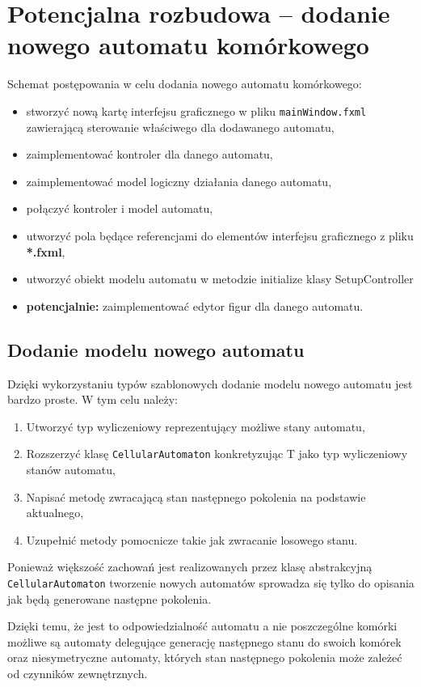 \documentclass{mwart}
\begin{document}
\section{Potencjalna rozbudowa -- dodanie nowego automatu komórkowego}
Schemat postępowania w celu dodania nowego automatu komórkowego:
\begin{itemize}
	\item stworzyć nową kartę interfejsu graficznego w pliku \texttt{mainWindow.fxml} zawierającą sterowanie właściwego dla dodawanego automatu,
	\item zaimplementować kontroler dla danego automatu,
	\item zaimplementować model logiczny działania danego automatu,
	\item połączyć kontroler i model automatu,
	\item utworzyć pola będące referencjami do elementów interfejsu graficznego z pliku \textbf{*.fxml}, 
	\item utworzyć obiekt modelu automatu w metodzie initialize klasy SetupController
	\item \textbf{potencjalnie: } zaimplementować edytor figur dla danego automatu.
\end{itemize}

\subsection{Dodanie modelu nowego automatu}
Dzięki wykorzystaniu typów szablonowych dodanie modelu nowego automatu jest bardzo proste.
W tym celu należy:

\begin{enumerate}
	\item Utworzyć typ wyliczeniowy reprezentujący możliwe stany automatu,
	\item Rozszerzyć klasę \texttt{CellularAutomaton} konkretyzując T jako typ wyliczeniowy stanów automatu,
	\item Napisać metodę zwracającą stan następnego pokolenia na podstawie aktualnego,
	\item Uzupełnić metody pomocnicze takie jak zwracanie losowego stanu.
\end{enumerate}

Ponieważ większość zachowań jest realizowanych przez klasę abstrakcyjną \texttt{CellularAutomaton} tworzenie nowych automatów sprowadza się tylko do opisania jak będą generowane następne pokolenia.

Dzięki temu, że jest to odpowiedzialność automatu a nie poszczególne komórki możliwe są automaty delegujące generację następnego stanu do swoich komórek oraz niesymetryczne automaty, których stan następnego pokolenia może zależeć od czynników zewnętrznych.
\end{document}
